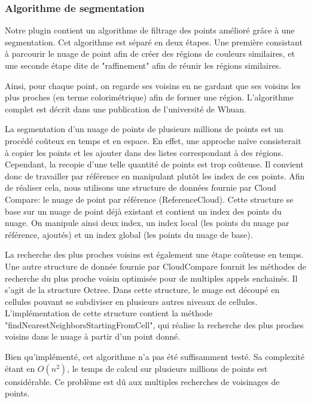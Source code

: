 \documentclass[12pt,titlepage,french]{article}
\begin{document}
\subsubsection{Algorithme de segmentation}

Notre plugin contient un algorithme de filtrage des points amélioré grâce à une segmentation. Cet algorithme est séparé en deux étapes. Une première consistant à parcourir le nuage de point afin de créer des régions de couleurs similaires, et une seconde étape dite de "raffinement" afin de réunir les régions similaires. \newline

Ainsi, pour chaque point, on regarde ses voisins en ne gardant que ses voisins les plus proches (en terme colorimétrique) afin de former une région. L'algorithme complet est décrit dans une publication de l'université de \cite{B01} Whuan. \newline

La segmentation d'un nuage de points de plusieurs millions de points est un procédé coûteux en temps et en espace. En effet, une approche naïve consisterait à copier les points et les ajouter dans des listes correspondant à des régions. Cependant, la recopie d'une telle quantité de points est trop coûteuse. Il convient donc de travailler par référence en manipulant plutôt les index de ces points.
Afin de réaliser cela, nous utilisons une structure de données fournie par Cloud Compare: le nuage de point par référence (ReferenceCloud). Cette structure se base sur un nuage de point déjà existant et contient un index des points du nuage. On manipule ainsi deux index, un index local (les points du nuage par référence, ajoutés) et un index global (les points du nuage de base). \newline

La recherche des plus proches voisins est également une étape coûteuse en temps. Une autre structure de donnée fournie par CloudCompare fournit les méthodes de recherche du plus proche voisin optimisée pour de multiples appels enchainés. Il s'agit de la structure Octree. Dans cette structure, le nuage est découpé en cellules pouvant se subdiviser en plusieurs autres niveaux de cellules. L'implémentation de cette structure contient la méthode "findNearestNeighborsStartingFromCell", qui réalise la recherche des plus proches voisins dans le nuage à partir d'un point donné. \newline

Bien qu'implémenté, cet algorithme n'a pas été suffisamment testé. Sa complexité étant en $O(n^{2})$, le temps de calcul sur plusieurs millions de points est considérable. Ce problème est dû aux multiples recherches de voisinages de points.
\end{document}
